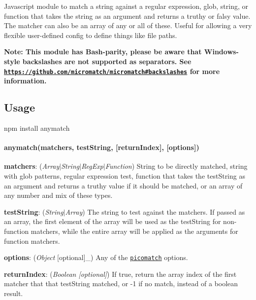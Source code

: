 Javascript module to match a string against a regular expression, glob, string, or function that takes the string as an argument and returns a truthy or falsy value. The matcher can also be an array of any or all of these. Useful for allowing a very flexible user-\/defined config to define things like file paths.

{\bfseries Note\+: This module has Bash-\/parity, please be aware that Windows-\/style backslashes are not supported as separators. See \href{https://github.com/micromatch/micromatch#backslashes}{\tt https\+://github.\+com/micromatch/micromatch\#backslashes} for more information.}

\subsection*{Usage }


\begin{DoxyCode}
npm install anymatch
\end{DoxyCode}


\paragraph*{anymatch(matchers, test\+String, \mbox{[}return\+Index\mbox{]}, \mbox{[}options\mbox{]})}


\begin{DoxyItemize}
\item {\bfseries matchers}\+: ({\itshape Array$\vert$\+String$\vert$\+Reg\+Exp$\vert$\+Function}) String to be directly matched, string with glob patterns, regular expression test, function that takes the test\+String as an argument and returns a truthy value if it should be matched, or an array of any number and mix of these types.
\item {\bfseries test\+String}\+: ({\itshape String$\vert$\+Array}) The string to test against the matchers. If passed as an array, the first element of the array will be used as the {\ttfamily test\+String} for non-\/function matchers, while the entire array will be applied as the arguments for function matchers.
\item {\bfseries options}\+: ({\itshape Object} \mbox{[}optional\mbox{]}\+\_\+) Any of the \href{https://github.com/micromatch/picomatch#options}{\tt picomatch} options.
\begin{DoxyItemize}
\item {\bfseries return\+Index}\+: ({\itshape Boolean \mbox{[}optional\mbox{]}}) If true, return the array index of the first matcher that that test\+String matched, or -\/1 if no match, instead of a boolean result.
\end{DoxyItemize}
\end{DoxyItemize}


